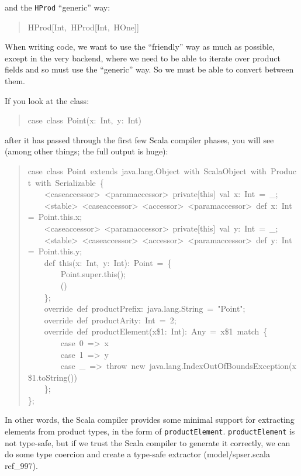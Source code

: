 \documentclass[a4]{article}
\begin{document}
and the \texttt{HProd} ``generic'' way:
%
\begin{quote}{\ttfamily \raggedright \noindent
HProd{[}Int,~HProd{[}Int,~HOne{]}{]}
}
\end{quote}

When writing code, we want to use the ``friendly'' way as much as possible,
except in the very backend, where we need to be able to iterate over product
fields and so must use the ``generic'' way. So we must be able to convert between
them.

If you look at the class:
%
\begin{quote}{\ttfamily \raggedright \noindent
case~class~Point(x:~Int,~y:~Int)
}
\end{quote}

after it has passed through the first few Scala compiler phases, you will see (among
other things; the full output is huge):
%
\begin{quote}{\ttfamily \raggedright \noindent
case~class~Point~extends~java.lang.Object~with~ScalaObject~with~Product~with~Serializable~\{\\
~~~~<caseaccessor>~<paramaccessor>~private{[}this{]}~val~x:~Int~=~\_;\\
~~~~<stable>~<caseaccessor>~<accessor>~<paramaccessor>~def~x:~Int~=~Point.this.x;\\
~~~~<caseaccessor>~<paramaccessor>~private{[}this{]}~val~y:~Int~=~\_;\\
~~~~<stable>~<caseaccessor>~<accessor>~<paramaccessor>~def~y:~Int~=~Point.this.y;\\
~~~~def~this(x:~Int,~y:~Int):~Point~=~\{\\
~~~~~~~~Point.super.this();\\
~~~~~~~~()\\
~~~~\};\\
~~~~override~def~productPrefix:~java.lang.String~=~"Point";\\
~~~~override~def~productArity:~Int~=~2;\\
~~~~override~def~productElement(x\$1:~Int):~Any~=~x\$1~match~\{\\
~~~~~~~~case~0~=>~x\\
~~~~~~~~case~1~=>~y\\
~~~~~~~~case~\_~=>~throw~new~java.lang.IndexOutOfBoundsException(x\$1.toString())\\
~~~~\};\\
\};
}
\end{quote}

In other words, the Scala compiler provides some minimal support for extracting
elements from product types, in the form of \texttt{productElement}.
\texttt{productElement} is not type-safe, but if we trust the Scala compiler to
generate it correctly, we can do some type coercion and create a type-safe
extractor (model/spser.scala ref\_997).
\end{document}
